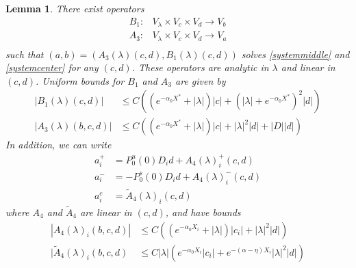 \documentclass[10pt,reqno]{amsart}
\theoremstyle{plain}
\newtheorem{lemma}[theorem]{Lemma}
\theoremstyle{definition}
\theoremstyle{remark}
\numberwithin{theorem}{section}
\numberwithin{equation}{section}
\begin{document}
\begin{lemma}\label{Zinv2}
There exist operators
\begin{align*}
B_1: &V_\lambda \times V_c \times V_d \rightarrow V_b \\
A_3: &V_\lambda \times V_c \times V_d \rightarrow V_a \\
\end{align*}
such that $( a, b ) = ( A_3(\lambda)(c, d), B_1(\lambda)(c, d) )$ solves \eqref{systemmiddle} and \eqref{systemcenter} for any $(c, d)$. These operators are analytic in $\lambda$ and linear in $(c, d)$. Uniform bounds for $B_1$ and $A_3$ are given by
\begin{align}
|B_1(\lambda)(c, d)| &\leq C\left( (e^{-\alpha_0 X^*} + |\lambda|)|c| + (|\lambda| + e^{-\alpha_0 X^*})^2 |d| \right) \label{B1bound} \\
|A_3(\lambda)(b, c, d)| &\leq C \left( (e^{-\alpha_0 X^*} + |\lambda|) |c| + |\lambda|^2 |d| + |D||d| \right) \label{A3bound} 
\end{align} 
In addition, we can write
\begin{align*}
a_i^+ &= P_0^u(0) D_i d + A_4(\lambda)_i^+(c, d) \\
a_i^- &= -P_0^s(0) D_i d + A_4(\lambda)_i^-(c, d) \\
a_i^c &= \tilde{A}_4(\lambda)_i(c, d) 
\end{align*}
where $A_4$ and $\tilde{A}_4$ are linear in $(c, d)$, and have bounds
\begin{align}
|A_4(\lambda)_i(b, c, d)|
&\leq C \left( (e^{-\alpha_0 X_i} + |\lambda|)|c_i| + |\lambda|^2|d| \right) \label{A4bound} \\
|\tilde{A}_4(\lambda)_i(b, c, d) &\leq C |\lambda| \left( e^{-\alpha_0 X_i} |c_i| + e^{-(\alpha - \eta)X_i} |\lambda|^2 |d| \right) \label{tildeA4bound}
\end{align}


\end{lemma}
\end{document}
